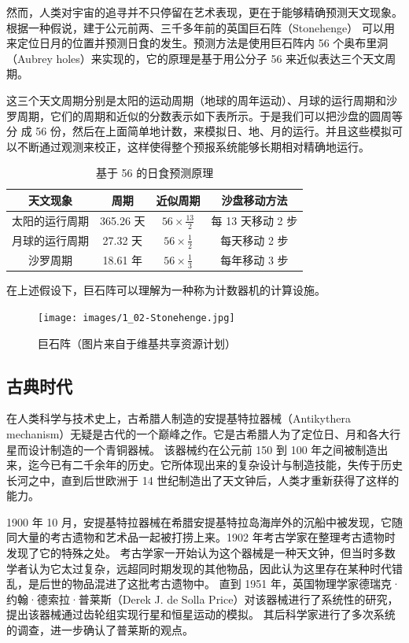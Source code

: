\documentclass[a4paper,10.5pt]{book}
\begin{document}
然而，人类对宇宙的追寻并不只停留在艺术表现，更在于能够精确预测天文现象。根据一种假说，建于公元前两、三千多年前的英国巨石阵（Stonehenge）
可以用来定位日月的位置并预测日食的发生。预测方法是使用巨石阵内 56 个奥布里洞（Aubrey holes）来实现的，它的原理是基于用公分子 56 来近似表达三个天文周期。

这三个天文周期分别是太阳的运动周期（地球的周年运动）、月球的运行周期和沙罗周期，它们的周期和近似的分数表示如下表所示。于是我们可以把沙盘的圆周等分
成 56 份，然后在上面简单地计数，来模拟日、地、月的运行。并且这些模拟可以不断通过观测来校正，这样使得整个预报系统能够长期相对精确地运行。\cite{beggs2012unifying}

\begin{table}[tbhp]
\centering
\begin{tabular}{|c|c|c|c|}
\hline
天文现象 & 周期 & 近似周期 & 沙盘移动方法 \\
\hline
太阳的运行周期 & 365.26 天 & $ 56 \times \frac{13}{2} $ & 每 13 天移动 2 步 \\
\hline
月球的运行周期 & 27.32 天 & $ 56 \times \frac{1}{2} $  & 每天移动 2 步 \\
\hline
沙罗周期 & 18.61 年 & $ 56 \times \frac{1}{3} $  & 每年移动 3 步 \\
\hline
\end{tabular}
\caption{基于 56 的日食预测原理}
\end{table}

在上述假设下，巨石阵可以理解为一种称为计数器机\cite{beggs2012unifying}的计算设施。

\begin{figure}[ht]
\centering
\texttt{[image: images/1\_02-Stonehenge.jpg]}
\caption{巨石阵（图片来自于维基共享资源计划）}
\end{figure}

\subsection{古典时代}

在人类科学与技术史上，古希腊人制造的安提基特拉器械（Antikythera mechanism）无疑是古代的一个巅峰之作。它是古希腊人为了定位日、月和各大行星而设计制造的一个青铜器械。
该器械约在公元前 150 到 100 年之间被制造出来，迄今已有二千余年的历史。它所体现出来的复杂设计与制造技能，失传于历史长河之中，直到后世欧洲于 14 世纪制造出了天文钟后，人类才重新获得了这样的能力。

1900 年 10 月，安提基特拉器械在希腊安提基特拉岛海岸外的沉船中被发现，它随同大量的考古遗物和艺术品一起被打捞上来。1902 年考古学家在整理考古遗物时发现了它的特殊之处。
考古学家一开始认为这个器械是一种天文钟，但当时多数学者认为它太过复杂，远超同时期发现的其他物品，因此认为这里存在某种时代错乱，是后世的物品混进了这批考古遗物中。
直到 1951 年，英国物理学家德瑞克·约翰·德索拉·普莱斯（Derek J. de Solla Price）对该器械进行了系统性的研究，提出该器械通过齿轮组实现行星和恒星运动的模拟。
其后科学家进行了多次系统的调查，进一步确认了普莱斯的观点。
\end{document}
